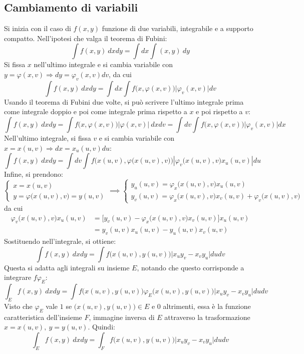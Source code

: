 \documentclass[10pt, a4paper]{scrartcl}
\theoremstyle{definition}
\numberwithin{esempio}{section}
\theoremstyle{definition}
\numberwithin{obs}{section}
\numberwithin{nota}{section}
\numberwithin{equation}{subsection}
\begin{document}
\subsection{Cambiamento di variabili}
Si inizia con il caso di $f(x,y)$ funzione di due variabili, integrabile e a supporto compatto.
Nell'ipotesi che valga il teorema di Fubini:
\[
\int f(x,y) \ dxdy = \int dx \int (x,y) \ dy
\] 
Si fissa $x$ nell'ultimo integrale e si cambia variabile con $y= \varphi (x,v)\Rightarrow dy = \varphi _v (x,v) dv $, da cui
\[
\int f(x,y) \ dxdy = \int dx \int f\big(x,\varphi (x,v)\big)\lvert \varphi _v(x,v) \rvert dv
\] 
Usando il teorema di Fubini due volte, si pu\`o scrivere l'ultimo integrale prima come integrale doppio e poi come integrale prima rispetto a $x$ e poi rispetto a $v$:
\[
\int f(x,y) \ dxdy = \int f\big(x,\varphi (x,v)\big) \lvert \varphi (x,v) \rvert  \ dxdv  = \int dv \int f\big(x,\varphi (x,v)\big)\lvert \varphi _v(x,v) \rvert  dx
\] 
Nell'ultimo integrale, si fissa $v$ e si cambia variabile con $x=x(u,v)\Rightarrow dx = x_u (u,v) du$:
\[
\int f(x,y) \ dxdy = \int dv \int f\Big(x(u,v) , \varphi \big(x(u,v), v\big)\Big) \left\lvert \varphi _v\big(x(u,v) , v\big) x_u(u,v)\right\rvert du
\] 
Infine, si prendono:
\[
\begin{cases}
	x = x(u,v)\\
	y=\varphi \big(x(u,v),v\big)=y(u,v)
\end{cases}\implies \begin{cases}
y_u(u,v) = \varphi _x\big(x(u,v),v\big) x_u(u,v)\\
y_v (u,v) = \varphi _x\big(x(u,v),v\big)x_v(u,v) + \varphi _v \big(x(u,v),v\big)
\end{cases} 
\] 
da cui
\[
	\begin{split}
		\varphi _v\big(x(u,v),v\big)x_u(u,v) &= \big[y_v(u,v) - \varphi_x \big(x(u,v),v\big) x_v(u,v)\big]x_u(u,v)\\
						     &=y_v(u,v) x_u(u,v) - y_u(u,v)x_v(u,v)
	\end{split}
\] 
Sostituendo nell'integrale, si ottiene:
\begin{equation}
	\int f(x,y) \ dxdy = \int f\big(x(u,v),y(u,v)\big) \lvert x_uy_v - x_vy_u \rvert dudv
\end{equation}
Questa si adatta agli integrali su insieme $E$, notando che questo corrisponde a integrare $f \varphi _E$:
\[
	\int_E f(x,y) \ dxdy = \int f\big(x(u,v),y(u,v)\big) \varphi _E \big(x(u,v) , y(u,v)\big)\lvert x_uy_v - x_vy_u \rvert dudv
\] 
Visto che $\varphi _E$ vale $1$ se $\big(x(u,v), y(u,v)\big) \in E$ e $0$ altrimenti, essa \`e la funzione caratteristica dell'insieme $F$, immagine inversa di $E$ attraverso la trasformazione $x=x(u,v) , \ y = y(u,v)$. 
Quindi:
\begin{equation}\label{varcambE}
	\int _E f(x,y) \ dxdy = \int_F f\big(x(u,v),y(u,v)\big) \lvert x_uy_v - x_vy_u \rvert dudv
\end{equation}
\end{document}
